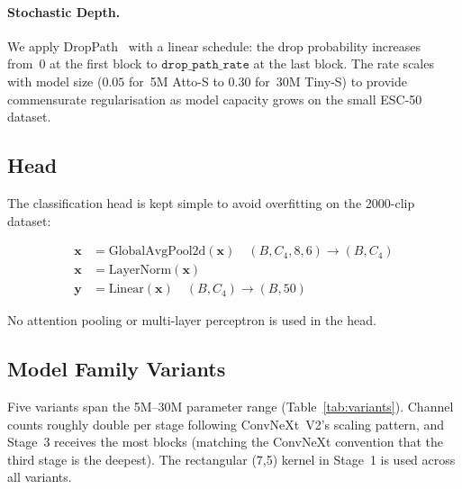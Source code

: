 \documentclass{article}
\begin{document}
\paragraph{Stochastic Depth.}
We apply DropPath~\cite{huang2016stochasticdepth} with a linear schedule:
the drop probability increases from~0 at the first block to
$\texttt{drop\_path\_rate}$ at the last block. The rate scales with model size
($0.05$ for~5M Atto-S to $0.30$ for~30M Tiny-S) to provide commensurate
regularisation as model capacity grows on the small ESC-50 dataset.

\subsection{Head}

The classification head is kept simple to avoid overfitting on the 2000-clip
dataset:

\begin{align}
  \mathbf{x} &= \text{GlobalAvgPool2d}(\mathbf{x}) \quad (B, C_4, 8, 6) \rightarrow (B, C_4)\\
  \mathbf{x} &= \text{LayerNorm}(\mathbf{x})\\
  \mathbf{y} &= \text{Linear}(\mathbf{x}) \quad (B, C_4) \rightarrow (B, 50)
\end{align}

No attention pooling or multi-layer perceptron is used in the head.

\subsection{Model Family Variants}

Five variants span the 5M--30M parameter range (Table~\ref{tab:variants}).
Channel counts roughly double per stage following ConvNeXt~V2's scaling
pattern, and Stage~3 receives the most blocks (matching the ConvNeXt convention
that the third stage is the deepest). The rectangular (7,5) kernel in Stage~1
is used across all variants.
\end{document}
